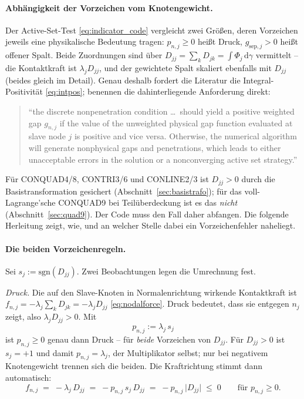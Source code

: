 \documentclass[a4paper,11pt]{article}
\def\bm#1{#1}%
\def\tilde#1{#1}%
\begin{document}
\paragraph{Abhängigkeit der Vorzeichen vom Knotengewicht.}
Der Active-Set-Test \eqref{eq:indicator_code} vergleicht zwei Größen, deren Vorzeichen jeweils eine
physikalische Bedeutung tragen: $p_{n,j}\ge0$ heißt Druck, $g_{\text{sep},j}>0$ heißt offener
Spalt. Beide Zuordnungen sind über $\tilde D_{jj}=\sum_k D_{jk}=\int\Phi_j\,\mathrm d\gamma$
vermittelt -- die Kontaktkraft ist $\lambda_j\tilde D_{jj}$, und der gewichtete Spalt skaliert
ebenfalls mit $\tilde D_{jj}$ (beides gleich im Detail). Genau deshalb fordert die Literatur die
Integral-Positivität \eqref{eq:intpos}; \citet[Abschn.~4.3]{popp2012} benennen die dahinterliegende
Anforderung direkt:
\begin{quote}
\small ``the discrete nonpenetration condition \ldots\ should yield a positive weighted gap
$\tilde g_{n,j}$ if the value of the unweighted physical gap function evaluated at slave node $j$
is positive and vice versa. Otherwise, the numerical algorithm will generate nonphysical gaps and
penetrations, which leads to either unacceptable errors in the solution or a nonconverging active
set strategy.'' \hfill \citep[Abschn.~4.3]{popp2012}
\end{quote}
Für CONQUAD4/8, CONTRI3/6 und CONLINE2/3 ist $\tilde D_{jj}>0$ durch die Basistransformation
gesichert (Abschnitt~\ref{sec:basistrafo}); für das voll-Lagrange'sche CONQUAD9 bei
Teilüberdeckung ist es das \emph{nicht} (Abschnitt~\ref{sec:quad9}). Der Code muss den Fall daher
abfangen. Die folgende Herleitung zeigt, wie, und an welcher Stelle dabei ein Vorzeichenfehler
naheliegt.

\paragraph{Die beiden Vorzeichenregeln.}
Sei $s_j:=\mathrm{sgn}(\tilde D_{jj})$. Zwei Beobachtungen legen die Umrechnung fest.

\emph{Druck.} Die auf den Slave-Knoten in Normalenrichtung wirkende Kontaktkraft ist
$f_{n,j}=-\lambda_j\sum_k D_{jk}=-\lambda_j\tilde D_{jj}$ \eqref{eq:nodalforce}. Druck bedeutet,
dass sie entgegen $\bm n_j$ zeigt, also $\lambda_j\tilde D_{jj}>0$. Mit
\begin{equation}
p_{n,j} := \lambda_j\,s_j
\label{eq:pn}
\end{equation}
ist $p_{n,j}\ge0$ genau dann Druck -- für \emph{beide} Vorzeichen von $\tilde D_{jj}$. Für
$\tilde D_{jj}>0$ ist $s_j=+1$ und damit $p_{n,j}=\lambda_j$, der Multiplikator selbst; nur bei
negativem Knotengewicht trennen sich die beiden. Die Kraftrichtung stimmt dann automatisch:
\begin{equation}
f_{n,j} \;=\; -\lambda_j\,\tilde D_{jj} \;=\; -p_{n,j}\,s_j\,\tilde D_{jj}
\;=\; -p_{n,j}\,\big|\tilde D_{jj}\big| \;\le\;0 \qquad\text{für } p_{n,j}\ge0 .
\end{equation}
\end{document}
